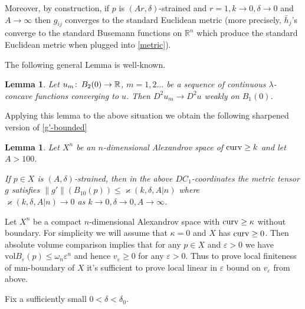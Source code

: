 \documentclass[12pt,leqno,intlimits]{amsart}
\numberwithin{equation}{section}
\newtheorem{lem}[thm]{Lemma}
\theoremstyle{definition}
\theoremstyle{remark}
\newcommand{\vol}{\mathrm{vol}}
\newcommand{\R}{\mathbb{R}}
\def\co{\colon\thinspace}
\def\eps{\varepsilon}
\newcommand{\curv}{\mathop{\rm curv}}
\begin{document}
Moreover, by construction, if $p$ is $(Ar,\delta)$-strained and $r=1,k\to 0,\delta\to 0$ and $A\to\infty$ then $g_{ij}$ converges to the standard Euclidean metric (more precisely, $\bar h_j$'s converge to the standard Busemann functions on $\R^n$ which produce the standard Euclidean metric when plugged into \eqref{metric}).



The following general Lemma is well-known.
\begin{lem}\label{concave-der-conv}
Let $u_m\co B_2(0)\to\R$, $m=1,2\ldots$ be a sequence of continuous $\lambda$-concave functions converging to $u$.
Then $D^2u_m\to D^2 u$ weakly on $B_1(0)$.
\end{lem}

Applying this lemma to the above situation we obtain the following sharpened version of \eqref{g'-bounded}

 \begin{lem}\label{lem-per-dc-1}
 Let $X^n$ be an $n$-dimensional Alexandrov space of $\curv\ge k$ and let $A>100$.

 If  $p\in X$ is
   $(A,\delta)$-strained, then  in the above $DC_1$-coordinates
the metric tensor $g$ satisfies $\|g'\| (B_{10}(p)) \leq \varkappa( k,\delta,A| n)$ where\\ $\varkappa(k,\delta,A| n)\to 0$ as $k\to 0, \delta\to 0,A\to\infty$.
 \end{lem}



 Let $X^n$ be a compact  $n$-dimensional Alexandrov space with $\curv\ge\kappa$ without boundary. For simplicity we will assume that  $\kappa=0$ and $X$ has $\curv\ge 0$.
 Then absolute volume comparison implies that for any $p\in X$ and $\eps>0$ we have $\vol B_\eps(p)\le \omega_n\eps^n$ and hence $v_\eps\ge 0$ for any $\eps>0$. Thus to prove local finiteness of mm-boundary of $X$ it's sufficient to prove local linear in $\eps$ bound on $v_\eps$ from above.

 Fix a sufficiently small $0<\delta<\delta_0$.


\end{document}
